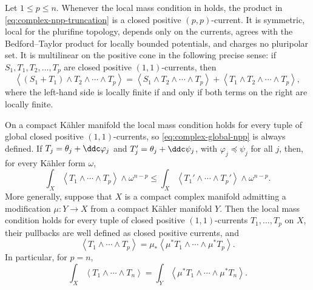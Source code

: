 \begin{theorem}\label{thm:complex-npp-ledger}
Let \(1\leq p\leq n\).  Whenever the local mass condition in
 holds, the product in
\eqref{eq:complex-npp-truncation} is a closed positive \((p,p)\)-current.
It is symmetric, local for the plurifine topology, depends only on the
currents, agrees with the Bedford--Taylor product for locally bounded
potentials, and charges no pluripolar set.  It is multilinear on the positive
cone in the following precise sense: if \(S_1,T_1,T_2,\ldots,T_p\) are
closed positive \((1,1)\)-currents, then
\[
 \left\langle (S_1+T_1)\wedge T_2\wedge\cdots\wedge T_p\right\rangle
 =\left\langle S_1\wedge T_2\wedge\cdots\wedge T_p\right\rangle
  +\left\langle T_1\wedge T_2\wedge\cdots\wedge T_p\right\rangle,
\]
where the left-hand side is locally finite if and only if both terms on the
right are locally finite.

On a compact K\"ahler manifold the local mass condition holds for every
tuple of global closed positive \((1,1)\)-currents, so
\eqref{eq:complex-global-npp} is always defined.  If
\(T_j=\theta_j+\ddc\varphi_j\) and
\(T_j'=\theta_j+\ddc\psi_j\), with
\(\varphi_j\preceq\psi_j\) for all \(j\), then, for every K\"ahler form
\(\omega\),
\[
 \int_X\left\langle T_1\wedge\cdots\wedge T_p\right\rangle
              \wedge\omega^{n-p}
 \leq
 \int_X\left\langle T_1'\wedge\cdots\wedge T_p'\right\rangle
              \wedge\omega^{n-p}.
\]
More generally, suppose that \(X\) is a compact complex manifold admitting
a modification \(\mu:Y\to X\) from a compact K\"ahler manifold \(Y\).
Then the local mass condition holds for every tuple of closed positive
\((1,1)\)-currents \(T_1,\ldots,T_p\) on \(X\), their pullbacks are
well defined as closed positive currents, and
\[
 \left\langle T_1\wedge\cdots\wedge T_p\right\rangle
 =\mu_*\left\langle
       \mu^*T_1\wedge\cdots\wedge\mu^*T_p\right\rangle .
\tag{51.16a}\label{eq:complex-npp-modification}
\]
In particular, for \(p=n\),
\[
 \int_X\left\langle T_1\wedge\cdots\wedge T_n\right\rangle
 =\int_Y\left\langle
       \mu^*T_1\wedge\cdots\wedge\mu^*T_n\right\rangle .
\]
\end{theorem}

